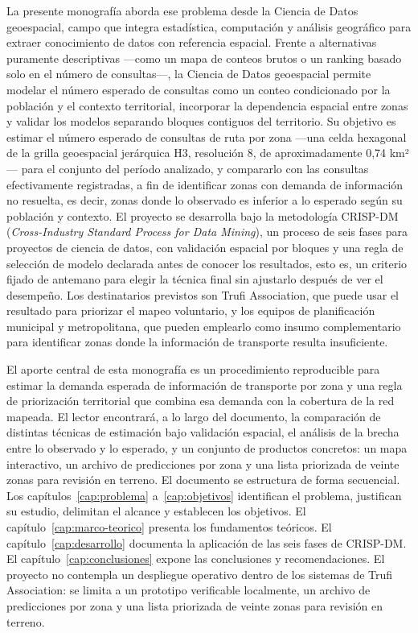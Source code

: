 La presente monografía aborda ese problema desde la Ciencia de Datos geoespacial, campo
que integra estadística, computación y análisis geográfico para extraer conocimiento de
datos con referencia espacial. Frente a alternativas puramente descriptivas —como un mapa
de conteos brutos o un ranking basado solo en el número de consultas—, la Ciencia de Datos
geoespacial permite modelar el número esperado de consultas como un conteo condicionado
por la población y el contexto territorial, incorporar la dependencia espacial entre zonas
y validar los modelos separando bloques contiguos del territorio. Su objetivo es estimar
el número esperado de consultas de ruta por zona —una celda hexagonal de la grilla
geoespacial jerárquica H3, resolución 8, de aproximadamente 0,74 km²— para el conjunto
del período analizado, y compararlo con las consultas efectivamente registradas, a fin de
identificar zonas con demanda de información no resuelta, es decir, zonas donde lo
observado es inferior a lo esperado según su población y contexto. El proyecto se
desarrolla bajo la metodología CRISP-DM (\textit{Cross-Industry Standard Process for Data
Mining}), un proceso de seis fases para proyectos de ciencia de datos, con validación
espacial por bloques y una regla de selección de modelo declarada antes de conocer los
resultados, esto es, un criterio fijado de antemano para elegir la técnica final sin
ajustarlo después de ver el desempeño. Los destinatarios previstos son Trufi
Association, que puede usar el resultado para priorizar el mapeo voluntario, y los equipos
de planificación municipal y metropolitana, que pueden emplearlo como insumo complementario
para identificar zonas donde la información de transporte resulta insuficiente.

El aporte central de esta monografía es un procedimiento reproducible para estimar la
demanda esperada de información de transporte por zona y una regla de priorización
territorial que combina esa demanda con la cobertura de la red mapeada. El lector
encontrará, a lo largo del documento, la comparación de distintas técnicas de estimación
bajo validación espacial, el análisis de la brecha entre lo observado y lo esperado, y un
conjunto de productos concretos: un mapa interactivo, un archivo de predicciones por zona
y una lista priorizada de veinte zonas para revisión en terreno. El documento se
estructura de forma secuencial. Los capítulos~\ref{cap:problema} a~\ref{cap:objetivos}
identifican el problema, justifican su estudio, delimitan el alcance y establecen los
objetivos. El capítulo~\ref{cap:marco-teorico} presenta los fundamentos teóricos. El
capítulo~\ref{cap:desarrollo} documenta la aplicación de las seis fases de CRISP-DM. El
capítulo~\ref{cap:conclusiones} expone las conclusiones y recomendaciones. El proyecto no
contempla un despliegue operativo dentro de los sistemas de Trufi Association: se limita a
un prototipo verificable localmente, un archivo de predicciones por zona y una lista
priorizada de veinte zonas para revisión en terreno.
